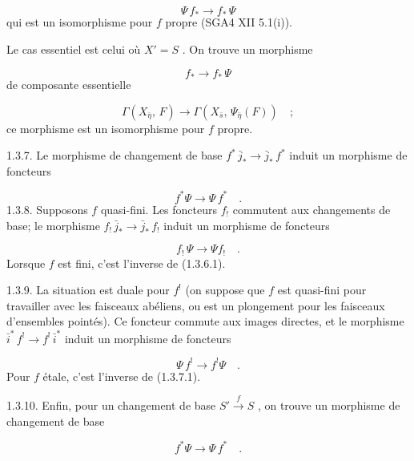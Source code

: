 \begin{equation}\tag{1.3.6.1}
\Psi\, f_* \longrightarrow f_*\, \Psi
\end{equation}
qui est un isomorphisme pour $f$ propre (SGA4 XII 5.1(i)).

Le cas essentiel est celui où $X' = S$ . On trouve un morphisme

\begin{equation}\tag{1.3.6.2}
f_* \longrightarrow f_*\, \Psi
\end{equation}
de composante essentielle

\begin{equation}\tag{1.3.6.3}
\Gamma(X_{\bar{\eta}},\, F) \longrightarrow \Gamma(X_{\bar{s}},\, \Psi_{\bar{\eta}}(F)) \quad ;
\end{equation}
ce morphisme est un isomorphisme pour $f$ propre.

1.3.7. Le morphisme de changement de base $f^*\,\bar{j}_* \longrightarrow \bar{j}_*\, f^*$ induit un morphisme de foncteurs

\begin{equation}\tag{1.3.7.1}
f^*\Psi \longrightarrow \Psi\, f^* \quad .
\end{equation}
1.3.8. Supposons $f$ quasi-fini. Les foncteurs $f_!$ commutent aux changements de base; le morphisme $f_!\,\bar{j}_* \longrightarrow \bar{j}_*\, f_!$ induit un morphisme de foncteurs

\begin{equation}\tag{1.3.8.1}
f_!\,\Psi \longrightarrow \Psi f_! \quad .
\end{equation}
Lorsque $f$ est fini, c'est l'inverse de (1.3.6.1).

1.3.9. La situation est duale pour $f^!$ (on suppose que $f$ est quasi-fini pour travailler avec les faisceaux abéliens, ou est un plongement pour les faisceaux d'ensembles pointés). Ce foncteur commute aux images directes, et le morphisme $\bar{i}^*\, f^! \longrightarrow f^!\,\bar{i}^*$ induit un morphisme de foncteurs

\begin{equation}\tag{1.3.9.1}
\Psi\, f^! \longrightarrow f^!\Psi \quad .
\end{equation}
Pour $f$ étale, c'est l'inverse de (1.3.7.1).

1.3.10. Enfin, pour un changement de base $S' \stackrel{f}{\longrightarrow} S$ , on trouve un morphisme de
changement de base

\begin{equation}\tag{1.3.10.1}
f^*\Psi \longrightarrow \Psi\, f^* \quad .
\end{equation}

